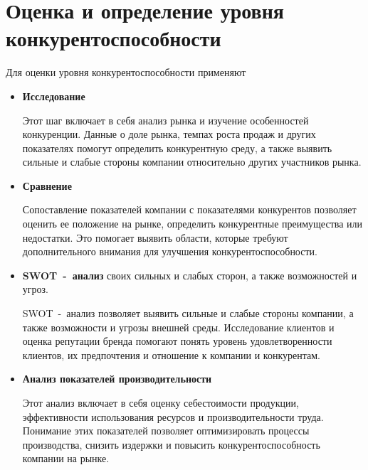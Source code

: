 \section{Оценка и определение уровня конкурентоспособности}
Для оценки уровня конкурентоспособности применяют~\cite{enemy}
\begin{itemize}
	\item \textbf{Исследование}
	
	Этот шаг включает в себя анализ рынка и изучение особенностей конкуренции. 
	Данные о доле рынка, темпах роста продаж и других показателях помогут определить конкурентную среду, а также выявить сильные и слабые стороны компании относительно других участников рынка.
	\item \textbf{Сравнение}
	
	Сопоставление показателей компании с показателями конкурентов позволяет оценить ее положение на рынке, определить конкурентные преимущества или недостатки. 
	Это помогает выявить области, которые требуют дополнительного внимания для улучшения конкурентоспособности.
	\item \textbf{SWOT~-~анализ} своих сильных и слабых сторон, а также возможностей и угроз. 
	
	SWOT~-~анализ позволяет выявить сильные и слабые стороны компании, а также возможности и угрозы внешней среды.
	Исследование клиентов и оценка репутации бренда помогают понять уровень удовлетворенности клиентов, их предпочтения и отношение к компании и конкурентам.
	\item \textbf{Анализ показателей производительности}
	
	Этот анализ включает в себя оценку себестоимости продукции, эффективности использования ресурсов и производительности труда. 
	Понимание этих показателей позволяет оптимизировать процессы производства, снизить издержки и повысить конкурентоспособность компании на рынке.
\end{itemize}








